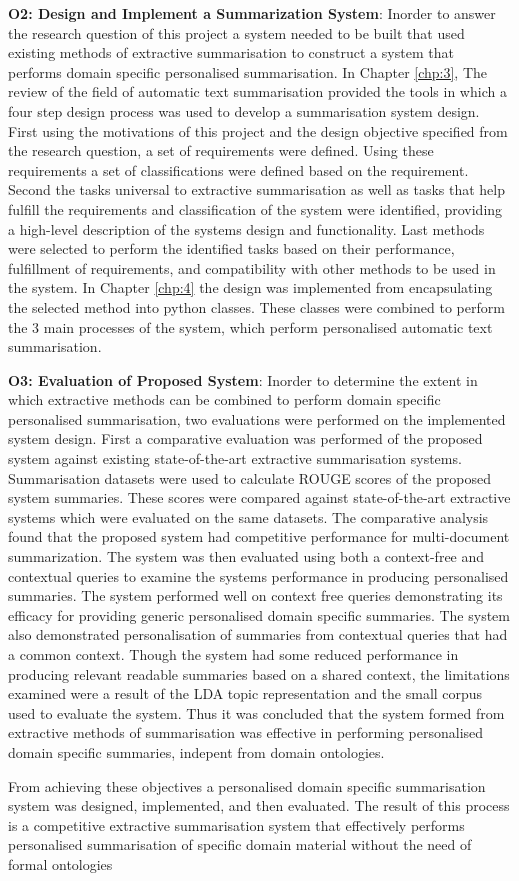 \textbf{O2: Design and Implement a Summarization System}:
Inorder to answer the research question of this project a system needed to be built that used existing methods of extractive summarisation to construct a system that performs domain specific personalised summarisation. In Chapter \ref{chp:3}, The review of the field of automatic text summarisation provided the tools in which a four step design process was used to develop a summarisation system design. First using the motivations of this project and the design objective specified from the research question, a set of requirements were defined. Using these requirements a set of classifications were defined based on the requirement. Second the tasks universal to extractive summarisation as well as tasks that help fulfill the requirements and classification of the system were identified, providing a high-level description of the systems design and functionality. Last methods were selected to perform the identified tasks based on their performance, fulfillment of requirements, and compatibility with other methods to be used in the system. In Chapter \ref{chp:4} the design was implemented from encapsulating the selected method into python classes. These classes were combined to perform the 3 main processes of the system, which perform personalised automatic text summarisation.

\textbf{O3: Evaluation of Proposed System}:
Inorder to determine the extent in which extractive methods can be combined to perform domain specific personalised summarisation, two evaluations were performed on the implemented system design. First a comparative evaluation was performed of the proposed system against existing state-of-the-art extractive summarisation systems. Summarisation datasets were used to calculate ROUGE scores of the proposed system summaries. These scores were compared against state-of-the-art extractive systems which were evaluated on the same datasets. The comparative analysis found that the proposed system had competitive performance for multi-document summarization. The system was then evaluated using both a context-free and contextual queries to examine the systems performance in producing personalised summaries. The system performed well on context free queries demonstrating its efficacy for providing generic personalised domain specific summaries. The system also demonstrated personalisation of summaries from contextual queries that had a common context. Though the system had some reduced performance in producing relevant readable summaries based on a shared context, the limitations examined were a result of the LDA topic representation and the small corpus used to evaluate the system. Thus it was concluded that the system formed from extractive methods of summarisation was effective in performing personalised domain specific summaries, indepent from domain ontologies.

From achieving these objectives a personalised domain specific summarisation system was designed, implemented, and then evaluated. The result of this process is a competitive extractive summarisation system that effectively performs personalised summarisation of specific domain material without the need of formal ontologies

